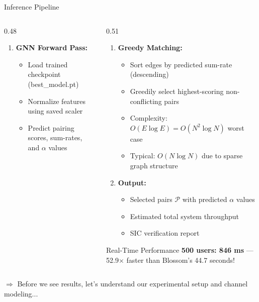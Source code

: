 \documentclass[aspectratio=169]{beamer}
\begin{document}
\begin{frame}{Inference Pipeline}
\begin{columns}[T]
\begin{column}{0.48\textwidth}
\begin{enumerate}
                \item \textbf{GNN Forward Pass:}
                \begin{itemize}\itemsep0em
                    \item Load trained checkpoint (best\_model.pt)
                    \item Normalize features using saved scaler
                    \item Predict pairing scores, sum-rates, and $\alpha$ values
                \end{itemize}
            \end{enumerate}
        \end{column}
        \begin{column}{0.51\textwidth} \vspace{-.8CM}
            \begin{enumerate}\itemsep0.1em
                \setcounter{enumi}{3}
                \item \textbf{Greedy Matching:}
                \begin{itemize}\itemsep0em
                    \item Sort edges by predicted sum-rate (descending)
                    \item Greedily select highest-scoring non-conflicting pairs
                    \item Complexity: $O(E \log E) = O(N^2 \log N)$ worst case
                    \item Typical: $O(N \log N)$ due to sparse graph structure
                \end{itemize}
                
                \item \textbf{Output:}
                \begin{itemize}\itemsep0em
                    \item Selected pairs $\mathcal{P}$ with predicted $\alpha$ values
                    \item Estimated total system throughput
                    \item SIC verification report
                \end{itemize}
            \end{enumerate}
            
            \vspace{-.8cm}
            \begin{exampleblock}{Real-Time Performance}
                \small
                \textbf{500 users: 846 ms} — 52.9$\times$ faster than Blossom's 44.7 seconds!
            \end{exampleblock}
        \end{column}
    \end{columns}
    
    \vspace{0.15cm}
    \small \textcolor{iiitblue}{$\Rightarrow$ Before we see results, let's understand our experimental setup and channel modeling...}
\end{frame}
\end{document}
